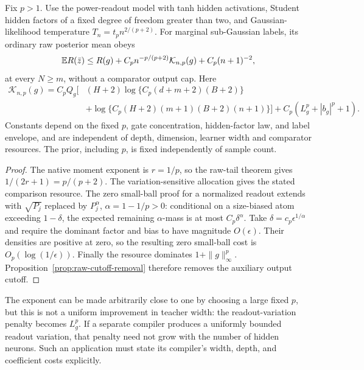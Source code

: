 \begin{corollary}
\label{cor:power-raw-oracle}
Fix $p>1$. Use the power-readout model with tanh hidden activations,
Student hidden factors of a fixed degree of freedom greater than two,
and Gaussian-likelihood temperature
$T_n=t_p n^{2/(p+2)}$. For marginal sub-Gaussian labels, its ordinary
raw posterior mean obeys
\[
 \mathbb E R(\bar z)\le R(g)+C_p n^{-p/(p+2)}\mathcal K_{n,p}(g)
                           +C_p(n+1)^{-2},
\]
at every $N\ge m$, without a comparator output cap. Here
\begin{align*}
 \mathcal K_{n,p}(g)=C_p Q_g\big[&(H+2)\log\{C_p(d+m+2)(B+2)\}\\
 &+\log\{C_p(H+2)(m+1)(B+2)(n+1)\}\big]
       +C_p(L_g^p+|b_g|^p+1).
\end{align*}
Constants depend on the fixed $p$, gate concentration, hidden-factor
law, and label envelope, and are independent of depth, dimension,
learner width and comparator resources. The prior, including $p$, is
fixed independently of sample count.
\end{corollary}
\begin{proof}
The native moment exponent is $r=1/p$, so the raw-tail theorem gives
$1/(2r+1)=p/(p+2)$. The variation-sensitive allocation gives the
stated comparison resource. The zero small-ball proof for a normalized
readout extends with $\sqrt{P_j}$ replaced by $P_j^\alpha$,
$\alpha=1-1/p>0$: conditional on a size-biased atom exceeding
$1-\delta$, the expected remaining $\alpha$-mass is at most
$C_p\delta^\alpha$. Take $\delta=c_p\epsilon^{1/\alpha}$ and
require the dominant factor and bias to have magnitude $O(\epsilon)$.
Their densities are positive at zero, so the resulting zero small-ball
cost is $O_p(\log(1/\epsilon))$. Finally the resource dominates
$1+\|g\|_\infty^p$. Proposition~\ref{prop:raw-cutoff-removal}
therefore removes the auxiliary output cutoff.
\end{proof}

The exponent can be made arbitrarily close to one by choosing a large
fixed $p$, but this is not a uniform improvement in teacher width:
the readout-variation penalty becomes $L_g^p$. If a separate compiler
produces a uniformly bounded readout variation, that penalty need not
grow with the number of hidden neurons. Such an application must state
its compiler's width, depth, and coefficient costs explicitly.
